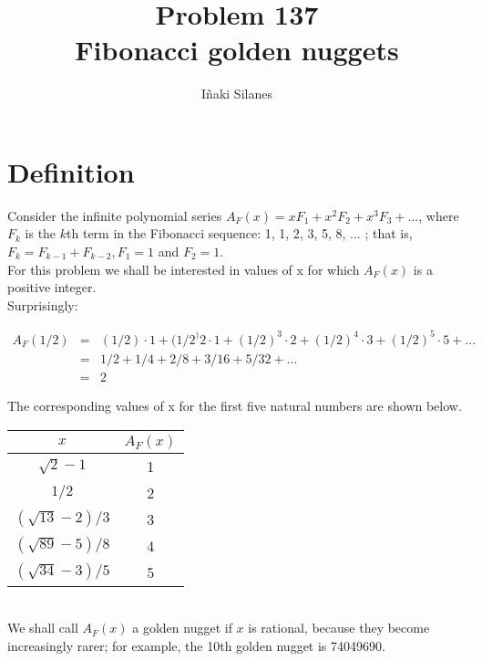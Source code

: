 \documentclass[english]{article}
\begin{document}
\newcommand{\mc}{\multicolumn}
\newcommand{\mr}{\multirow}
\newcommand{\cw}{\columnwidth}
\newcommand{\ig}[2]{\texttt{[image: \#2]}}

\title{Problem 137\\Fibonacci golden nuggets}
\author{I\~naki Silanes}
\maketitle

\section{Definition}

Consider the infinite polynomial series $A_{F}(x) = x F_1 + x^2 F_2 + x^3 F_3 + ...$, where $F_k$ is the $k$th term in the Fibonacci sequence: 1, 1, 2, 3, 5, 8, ... ; that is, $F_k = F_{k-1}+ F_{k-2}, F_1 = 1$ and $F_2 = 1$.\\

For this problem we shall be interested in values of x for which $A_F(x)$ is a positive integer.\\

Surprisingly:

\begin{eqnarray}
A_F(1/2) & = & (1/2)\cdot 1 + (1/2^)2\cdot 1 + (1/2)^3\cdot 2 + (1/2)^4\cdot 3 + (1/2)^5\cdot 5 + ...\\
  	 & = & 	1/2 + 1/4 + 2/8 + 3/16 + 5/32 + ...\\
  	 & = & 	2
\end{eqnarray}

The corresponding values of x for the first five natural numbers are shown below.\\

\begin{center}
  \begin{tabular}{cc} \hline
	$x$               & $A_F(x)$ \\ \hline
	$\sqrt{2}-1$      & 1 \\
	$1/2$             & 2 \\
	$(\sqrt{13}-2)/3$ & 3 \\
	$(\sqrt{89}-5)/8$ & 4 \\
	$(\sqrt{34}-3)/5$ & 5 \\ \hline
  \end{tabular}
\end{center}
\ \\

We shall call $A_F(x)$ a golden nugget if $x$ is rational, because they become increasingly rarer; for example, the 10th golden nugget is 74049690.\\
\end{document}
